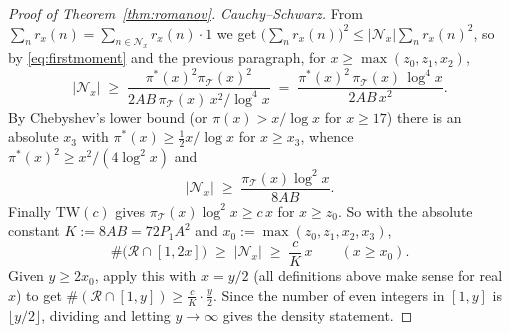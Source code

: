 \documentclass[10pt,a4paper]{amsart}
\newcommand{\T}{\mathcal{T}}
\begin{document}
\begin{proof}[Proof of Theorem~\ref{thm:romanov}]
\emph{Cauchy--Schwarz.} From
$\sum_n r_x(n) = \sum_{n \in \mathcal{N}_x} r_x(n)\cdot 1$ we get
$\bigl(\sum_n r_x(n)\bigr)^{2} \le |\mathcal{N}_x| \sum_n r_x(n)^{2}$, so by
\eqref{eq:firstmoment} and the previous paragraph, for
$x \ge \max(z_0, z_1, x_2)$,
\[
  |\mathcal{N}_x| \;\ge\;
  \frac{\pi^{*}(x)^{2}\pi_\T(x)^{2}}{2AB\,\pi_\T(x)\,x^{2}/\log^{4}x}
  \;=\; \frac{\pi^{*}(x)^{2}\,\pi_\T(x)\,\log^{4}x}{2AB\,x^{2}} .
\]
By Chebyshev's lower bound (or $\pi(x) > x/\log x$ for $x \ge 17$) there is an
absolute $x_3$ with $\pi^{*}(x) \ge \tfrac12 x/\log x$ for $x \ge x_3$, whence
$\pi^{*}(x)^{2} \ge x^{2}/(4\log^{2}x)$ and
\[
  |\mathcal{N}_x| \;\ge\; \frac{\pi_\T(x)\log^{2}x}{8AB} .
\]
Finally $\mathrm{TW}(c)$ gives $\pi_\T(x)\log^{2}x \ge c\,x$ for $x \ge z_0$.
So with the absolute constant $K := 8AB = 72 P_1 A^{2}$ and
$x_0 := \max(z_0, z_1, x_2, x_3)$,
\[
  \#\bigl(\mathcal{R}\cap[1,2x]\bigr) \;\ge\; |\mathcal{N}_x|
  \;\ge\; \frac{c}{K}\,x \qquad (x \ge x_0).
\]
Given $y \ge 2x_0$, apply this with $x = y/2$ (all definitions above make
sense for real $x$) to get
$\#(\mathcal{R}\cap[1,y]) \ge \frac{c}{K}\cdot\frac{y}{2}$. Since the number of
even integers in $[1,y]$ is $\lfloor y/2\rfloor$, dividing and letting
$y \to \infty$ gives the density statement.
\end{proof}
\end{document}
